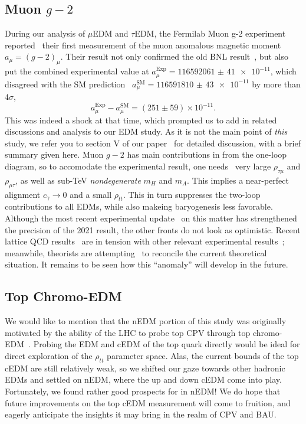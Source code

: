 \subsection{Muon \(g-2 \)}
During our analysis of \(\mu \)EDM and \(\tau \)EDM, the Fermilab Muon g-2 experiment reported~\cite{Fermilab2021MuonGminus2} their first measurement of the muon anomalous magnetic moment \(a_{\mu} = (g-2)_{\mu} \).
Their result not only confirmed the old BNL result~\cite{BNL2006MuonGminus2}, but also put the combined experimental value at \(a_{\mu}^{\text{Exp}} = \num{116592061(41)e-11} \),
which disagreed with the SM prediction~\cite{Aoyama2020MuonTheory} \(a_{\mu}^{\text{SM}} = \num{116591810(43)e-11} \) by more than \(4\sigma \),
\begin{equation}
    a_{\mu}^{\text{Exp}} - a_{\mu}^{\text{SM}} = (251 \pm 59) \times 10^{-11}.
\end{equation}
This was indeed a shock at that time, which prompted us to add in related discussions and analysis to our EDM study.
As it is not the main point of \textit{this} study, we refer you to section V of our paper~\cite{HKT2022MuonEDMTauEDM} for detailed discussion, with a brief summary given here.
Muon \(g-2 \) has main contributions in {\gthdm} from the one-loop diagram, so to accomodate the experimental result, 
one needs~\cite{HouEtal2021Muon} very large \(\rho_{\tau\mu} \) and \(\rho_{\mu\tau} \), as well as sub-TeV \textit{nondegenerate} \(m_{H} \) and \(m_{A} \).
This implies a near-perfect alignment \(c_{\gamma} \to 0\) and a small \(\rho_{tt} \).
This in turn suppresses the two-loop contributions to all EDMs, while also makeing baryogenesis less favorable.
Although the most recent experimental update~\cite{Muon2023Gminus2} on this matter has strengthened the precision of the 2021 result, 
the other fronts do not look as optimistic.
Recent lattice QCD results~\cite{Borsanyi2021Lattice} are in tension with other relevant experimental results~\cite{CMD32023eetopipi};
meanwhile, theorists are attempting~\cite{Colangelo2022Gminus2theory} to reconcile the current theoretical situation.
It remains to be seen how this ``anomaly'' will develop in the future.

\subsection{Top Chromo-EDM}\label{sec:top-cedm}
We would like to mention that the nEDM portion of this study was originally motivated by the ability of the LHC to probe top CPV through top chromo-EDM~\cite{CMS2023}.
Probing the EDM and cEDM of the top quark directly would be ideal for direct exploration of the \(\rho_{tt} \) parameter space.
Alas, the current bounds of the top cEDM are still relatively weak, so we shifted our gaze towards other hadronic EDMs and settled on nEDM, 
where the up and down cEDM come into play.
Fortunately, we found rather good prospects for {\gthdm} in nEDM!
We do hope that future improvements on the top cEDM measurement will come to fruition,
and eagerly anticipate the insights it may bring in the realm of CPV and BAU.


